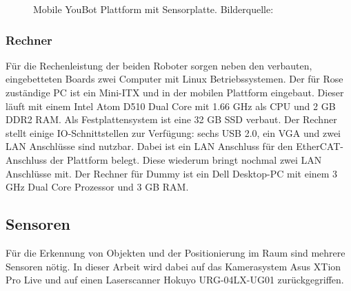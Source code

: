  \begin{figure}[H]
 	\centering
 	\caption[Mobile YouBot Plattform mit Sensorplatte]{Mobile YouBot Plattform mit Sensorplatte. Bilderquelle: \cite{kuka2015}}
 	\label{fig:basic-aufbau-youbot-base-full}
 \end{figure}

\subsubsection{Rechner}
Für die Rechenleistung der beiden Roboter sorgen neben den verbauten, eingebetteten Boards zwei Computer mit Linux Betriebssystemen.
Der für Rose zuständige PC ist ein Mini-ITX und in der mobilen Plattform eingebaut. Dieser läuft mit einem Intel Atom D510 Dual Core mit 1.66 GHz als CPU und 2 GB DDR2 RAM. Als Festplattensystem ist eine 32 GB SSD verbaut. Der Rechner stellt einige IO-Schnittstellen zur Verfügung: sechs USB 2.0, ein VGA und zwei LAN Anschlüsse sind nutzbar. Dabei ist ein LAN Anschluss für den EtherCAT-Anschluss der Plattform belegt. Diese wiederum bringt nochmal zwei LAN Anschlüsse mit. Der Rechner für Dummy ist ein Dell Desktop-PC mit einem 3 GHz Dual Core Prozessor und 3 GB RAM. 

\subsection{Sensoren}
\label{sec:aufbau-sensoren}
Für die Erkennung von Objekten und der Positionierung im Raum sind mehrere Sensoren nötig. In dieser Arbeit wird dabei auf das Kamerasystem Asus XTion Pro Live und auf einen Laserscanner Hokuyo URG-04LX-UG01 zurückgegriffen.


